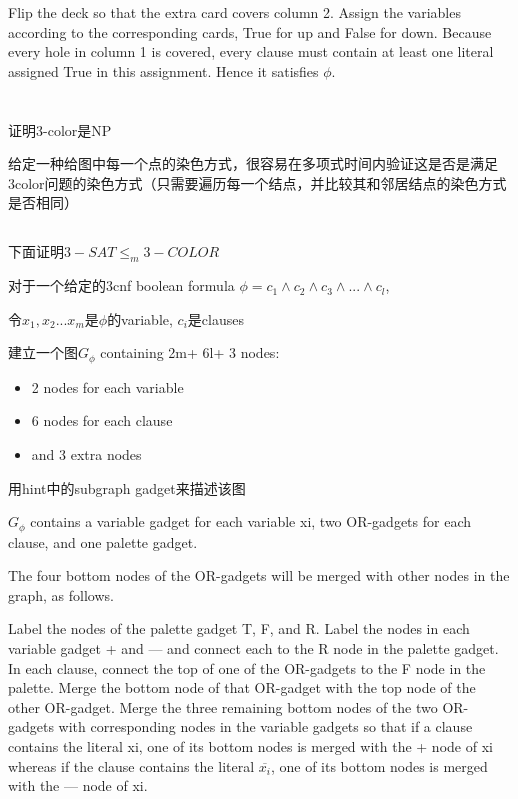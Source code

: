 \documentclass{zpt}
\begin{document}
Flip the deck so that the extra card covers column 2. Assign the variables according to the corresponding cards, True for up and False for down. Because every hole in column 1 is covered, every clause must contain at least one literal assigned True in this assignment. Hence it satisfies $\phi$.

\section{}
\subsection{}
证明3-color是NP

  给定一种给图中每一个点的染色方式，很容易在多项式时间内验证这是否是满足3color问题的染色方式（只需要遍历每一个结点，并比较其和邻居结点的染色方式是否相同）

\subsection{}
下面证明$3-SAT\le_m 3-COLOR$

对于一个给定的3cnf boolean formula $\phi=c_1\wedge c_2\wedge c_3\wedge ...\wedge c_l$,

令$x_1,x_2...x_m$是$\phi$的variable, $c_i$是clauses

建立一个图$G_\phi$ containing 2m+ 6l+ 3 nodes:
\begin{itemize}
    \item 2 nodes  for each variable
    \item 6 nodes for each clause
    \item and 3 extra nodes
\end{itemize}

用hint中的subgraph gadget来描述该图

$G_\phi$  contains a variable gadget for each variable xi, two OR-gadgets for each clause, and one palette gadget.

The four bottom nodes of the OR-gadgets will be merged with other nodes in the graph, as follows.

Label the nodes of the palette gadget T, F, and R. Label the nodes in each variable gadget + and — and connect each to the R node in the palette gadget. In each clause, connect the top of one of the OR-gadgets to the F node in the palette. Merge the bottom node of that OR-gadget with the top node of the other OR-gadget. Merge the three remaining bottom nodes of the two OR-gadgets with corresponding nodes in the variable gadgets so that if a clause contains the literal xi, one of its bottom nodes is merged with the + node of xi whereas if the clause contains the literal $\overline{x_i}$, one of its bottom nodes is merged with the — node of xi.
\end{document}
